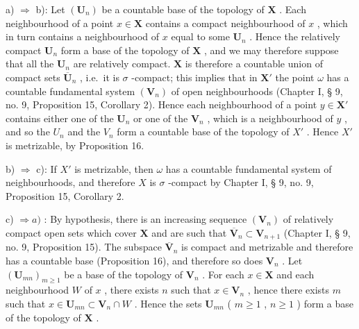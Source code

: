 a) \(\Longrightarrow\) b): Let \((\mathbf{U}_n)\) be a countable base of the topology of \(\mathbf{X}\) . Each neighbourhood of a point \(x \in \mathbf{X}\) contains a compact neighbourhood of \(x\) , which in turn contains a neighbourhood of \(x\) equal to some \(\mathbf{U}_n\) . Hence the relatively compact \(\mathbf{U}_n\) form a base of the topology of \(\mathbf{X}\) , and we may therefore suppose that all the \(\mathbf{U}_n\) are relatively compact. \(\mathbf{X}\) is therefore a countable union of compact sets \(\overline{\mathbf{U}}_n\) , i.e.~it is \(\sigma\) -compact; this implies that in \(\mathbf{X}'\) the point \(\omega\) has a countable fundamental system \((\mathbf{V}_n)\) of open neighbourhoods (Chapter I, § 9, no. 9, Proposition 15, Corollary 2). Hence each neighbourhood of a point \(y \in \mathbf{X}'\) contains either one of the \(\mathbf{U}_n\) or one of the \(\mathbf{V}_n\) , which is a neighbourhood of \(y\) , and so the \(U_{n}\) and the \(V_{n}\) form a countable base of the topology of \(X'\) . Hence \(X'\) is metrizable, by Proposition 16.

b) \(\Longrightarrow\) c): If \(X'\) is metrizable, then \(\omega\) has a countable fundamental system of neighbourhoods, and therefore \(X\) is \(\sigma\) -compact by Chapter I, § 9, no. 9, Proposition 15, Corollary 2.

c) \(\Longrightarrow a)\) : By hypothesis, there is an increasing sequence \((\mathbf{V}_n)\) of relatively compact open sets which cover \(\mathbf{X}\) and are such that \(\overline{\mathbf{V}}_n \subset \mathbf{V}_{n+1}\) (Chapter I, § 9, no. 9, Proposition 15). The subspace \(\overline{\mathbf{V}}_n\) is compact and metrizable and therefore has a countable base (Proposition 16), and therefore so does \(\mathbf{V}_n\) . Let \((\mathbf{U}_{mn})_{m \geqslant 1}\) be a base of the topology of \(\mathbf{V}_n\) . For each \(x \in \mathbf{X}\) and each neighbourhood \(W\) of \(x\) , there exists \(n\) such that \(x \in \mathbf{V}_n\) , hence there exists \(m\) such that \(x \in \mathbf{U}_{mn} \subset \mathbf{V}_n \cap W\) . Hence the sets \(\mathbf{U}_{mn}\) ( \(m \geqslant 1\) , \(n \geqslant 1\) ) form a base of the topology of \(\mathbf{X}\) .
